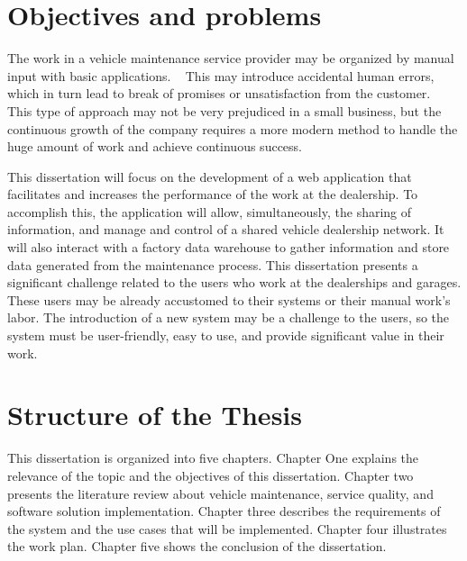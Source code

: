 \section{Objectives and problems}

The work in a vehicle maintenance service provider may be organized by manual input with basic applications. ~\cite{MAS_MOTORS} 
This may introduce accidental human errors, which in turn lead to break of promises or unsatisfaction from the customer. ~\cite{MAS_MOTORS} ~\cite{Setting_the_after_sale_process}
This type of approach may not be very prejudiced in a small business, but the continuous growth of the company requires a more modern method to handle the huge amount of work and achieve continuous success. ~\cite{MAS_MOTORS}

This dissertation will focus on the development of a web application that facilitates and increases the performance of the work at the dealership.
To accomplish this, the application will allow, simultaneously,  the sharing of information, and manage and control of a shared vehicle dealership network.
It will also interact with a factory data warehouse to gather information and store data generated from the maintenance process. 
This dissertation presents a significant challenge related to the users who work at the dealerships and garages. 
These users may be already accustomed to their systems or their manual work's labor.  
The introduction of a new system may be a challenge to the users, so the system must be user-friendly, easy to use, and provide significant value in their work.

\section{Structure of the Thesis}

This dissertation is organized into five chapters. Chapter One explains the relevance of the topic and the objectives of this dissertation.
Chapter two presents the literature review about vehicle maintenance, service quality, and software solution implementation. 
Chapter three describes the requirements of the system and the use cases that will be implemented.
Chapter four illustrates the work plan.
Chapter five shows the conclusion of the dissertation. 

